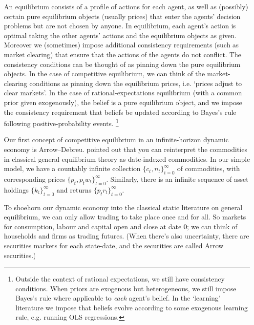 \documentclass[11pt,letterpaper,reqno,oneside]{article}
\begin{document}
An equilibrium consists of a profile of actions for each agent, as well as (possibly) certain pure equilibrium objects (usually prices) that enter the agents' decision problems but are not chosen by anyone. In equilibrium, each agent's action is optimal taking the other agents' actions and the equilibrium objects as given. Moreover we  (sometimes) impose additional consistency requirements (such as market clearing) that ensure that the actions of the agents do not conflict. The consistency conditions can be thought of as pinning down the pure equilibrium objects. In the case of competitive equilibrium, we can think of the market-clearing conditions as pinning down the equilibrium prices, i.e. `prices adjust to clear markets'. In the case of rational-expectations equilibrium (with a common prior given exogenously), the belief is a pure equilibrium object, and we impose the consistency requirement that beliefs be updated according to Bayes's rule following positive-probability events.%
	\footnote{Outside the context of rational expectations, we still have consistency conditions. When priors are exogenous but heterogeneous, we still impose Bayes's rule where applicable to \emph{each} agent's belief. In the `learning' literature we impose that beliefs evolve according to some exogenous learning rule, e.g. running OLS regressions.}

Our first concept of competitive equilibrium in an infinite-horizon dynamic economy is Arrow--Debreu. \textcite{Debreu1959} pointed out that you can reinterpret the commodities in classical general equilibrium theory as date-indexed commodities. In our simple model, we have a countably infinite collection $\{ c_t, n_t \}_{t=0}^\infty$ of commodities, with corresponding prices $\{ p_t, p_t w_t \}_{t=0}^\infty$. Similarly, there is an infinite sequence of asset holdings $\{ k_t \}_{t=0}^\infty$ and returns $\{ p_t r_t \}_{t=0}^\infty$.

To shoehorn our dynamic economy into the classical static literature on general equilibrium, we can only allow trading to take place once and for all. So markets for consumption, labour and capital open and close at date $0$; we can think of households and firms as trading futures. (When there's also uncertainty, there are securities markets for each state-date, and the securities are called Arrow securities.)
\end{document}
